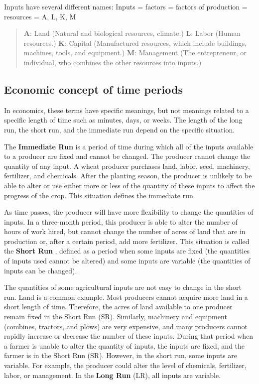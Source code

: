 \documentclass[11pt,]{book}
\theoremstyle{definition}
\theoremstyle{definition}
\theoremstyle{definition}
\theoremstyle{remark}
\begin{document}
Inputs have several different names: Inputs = factors = factors of
production = resources = A, L, K, M

\begin{quote}
\textbf{A}: Land (Natural and biological resources, climate.)
\newline \textbf{L}: Labor (Human resources.) \newline \textbf{K}:
Capital (Manufactured resources, which include buildings, machines,
tools, and equipment.) \newline \textbf{M}: Management (The
entrepreneur, or individual, who combines the other resources into
inputs.)
\end{quote}

\subsection{Economic concept of time
periods}\label{economic-concept-of-time-periods}

In economics, these terms have specific meanings, but not meanings
related to a specific length of time such as minutes, days, or weeks.
The length of the long run, the short run, and the immediate run depend
on the specific situation.

The \textbf{Immediate Run} is a period of time during which all of the
inputs available to a producer are fixed and cannot be changed. The
producer cannot change the quantity of any input. A wheat producer
purchases land, labor, seed, machinery, fertilizer, and chemicals. After
the planting season, the producer is unlikely to be able to alter or use
either more or less of the quantity of these inputs to affect the
progress of the crop. This situation defines the immediate run.

As time passes, the producer will have more flexibility to change the
quantities of inputs. In a three-month period, this producer is able to
alter the number of hours of work hired, but cannot change the number of
acres of land that are in production or, after a certain period, add
more fertilizer. This situation is called the \textbf{Short Run} ,
defined as a period when some inputs are fixed (the quantities of inputs
used cannot be altered) and some inputs are variable (the quantities of
inputs can be changed).

The quantities of some agricultural inputs are not easy to change in the
short run. Land is a common example. Most producers cannot acquire more
land in a short length of time. Therefore, the acres of land available
to one producer remain fixed in the Short Run (SR). Similarly, machinery
and equipment (combines, tractors, and plows) are very expensive, and
many producers cannot rapidly increase or decrease the number of these
inputs. During that period when a farmer is unable to alter the quantity
of inputs, the inputs are fixed, and the farmer is in the Short Run
(SR). However, in the short run, some inputs are variable. For example,
the producer could alter the level of chemicals, fertilizer, labor, or
management. In the \textbf{Long Run} (LR), all inputs are variable.
\end{document}
